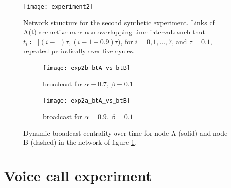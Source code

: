 \begin{figure}[h]\centering
    \texttt{[image: experiment2]}
    \caption{Network structure for the second synthetic experiment. Links of A(t) are active over non-overlapping time intervals such that $t_i\coloneqq[(i − 1)\tau , (i − 1 + 0.9)\tau )$, for $i=0, 1, \dots , 7$, and $\tau =0.1$, repeated periodically over five cycles.}
    \label{fig:exp2}
    \bigskip
\end{figure}

\begin{figure}
     \centering
     \begin{subfigure}[b]{0.49\textwidth}
         \centering
         \texttt{[image: exp2b\_btA\_vs\_btB]}
         \caption{broadcast for $\alpha = 0.7 ,~\beta = 0.1$}
         \label{fig:bt5}
     \end{subfigure}
     \hfill
     \begin{subfigure}[b]{0.49\textwidth}
         \centering
         \texttt{[image: exp2a\_btA\_vs\_btB]}
         \caption{broadcast for $\alpha = 0.9 ,~\beta = 0.1$}
         \label{fig:bt6}
     \end{subfigure}
     \caption{Dynamic broadcast centrality over time for node A (solid) and node B (dashed) in the network of figure \ref{fig:exp2}.}
     \label{fig:twobt}
\end{figure}


\section{Voice call experiment}
\label{sec:voicecall}

